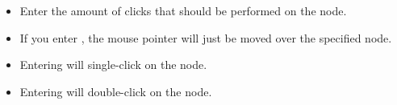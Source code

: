 \begin{itemize}
\item Enter the amount of clicks that should be performed on the node.
\item If you enter , the mouse pointer will just be moved over the specified node.
\item Entering  will single-click on the node.
\item Entering  will double-click on the node. 
\end{itemize}
